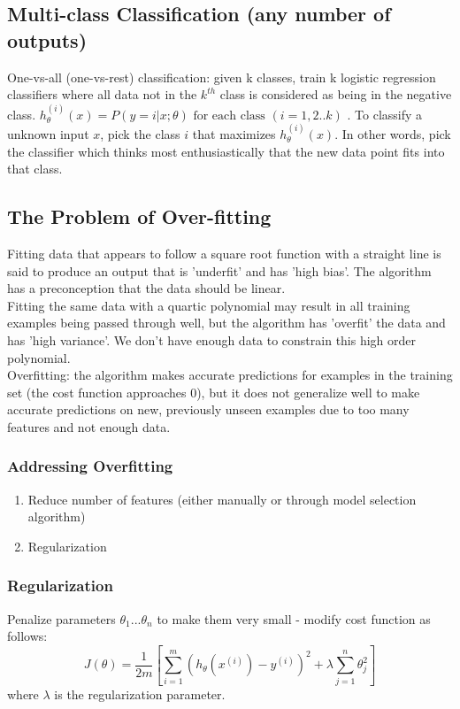 \documentclass[11pt,letterpaper]{article}
\begin{document}
\subsection{Multi-class Classification (any number of outputs)}
One-vs-all (one-vs-rest) classification: given k classes, train k logistic regression classifiers where all data not in the $k^{th}$ class is considered as being in the negative class. $h_\theta^{(i)}(x) = P(y = i | x;\theta) \textrm{ for each class } (i = 1,2 .. k)$ . To classify a unknown input $x$, pick the class $i$ that maximizes $h_\theta^{(i)}(x)$. In other words, pick the classifier which thinks most enthusiastically that the new data point fits into that class.

\subsection{The Problem of Over-fitting}
Fitting data that appears to follow a square root function with a straight line is said to produce an output that is 'underfit' and has 'high bias'. The algorithm has a preconception that the data should be linear.\\
Fitting the same data with a quartic polynomial may result in all training examples being passed through well, but the algorithm has 'overfit' the data and has 'high variance'. We don't have enough data to constrain this high order polynomial.\\
Overfitting: the algorithm makes accurate predictions for examples in the training set (the cost function approaches 0), but it does not generalize well to make accurate predictions on new, previously unseen examples due to too many features and not enough data.
\subsubsection{Addressing Overfitting}
\begin{enumerate}
	\item Reduce number of features (either manually or through model selection algorithm)
	\item Regularization
\end{enumerate}

\subsubsection{Regularization}
Penalize parameters $\theta_1 ... \theta_n$  to make them very small - modify cost function as follows:
$$ J(\theta) = \frac{1}{2m}[\sum_{i=1}^{m}(h_\theta(x^{(i)}) - y^{(i)})^2 + \lambda \sum_{j=1}^{n}\theta_j^2] $$ where $\lambda$ is the regularization parameter.
\end{document}
